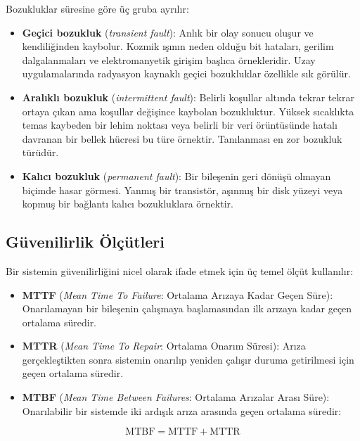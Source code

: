 Bozukluklar süresine göre üç gruba ayrılır:
\begin{itemize}
    \item \textbf{Geçici bozukluk} (\emph{transient fault}): Anlık bir olay sonucu oluşur ve kendiliğinden kaybolur. Kozmik ışının neden olduğu bit hataları, gerilim dalgalanmaları ve elektromanyetik girişim başlıca örnekleridir. Uzay uygulamalarında radyasyon kaynaklı geçici bozukluklar özellikle sık görülür.
    \item \textbf{Aralıklı bozukluk} (\emph{intermittent fault}): Belirli koşullar altında tekrar tekrar ortaya çıkan ama koşullar değişince kaybolan bozukluktur. Yüksek sıcaklıkta temas kaybeden bir lehim noktası veya belirli bir veri örüntüsünde hatalı davranan bir bellek hücresi bu türe örnektir. Tanılanması en zor bozukluk türüdür.
    \item \textbf{Kalıcı bozukluk} (\emph{permanent fault}): Bir bileşenin geri dönüşü olmayan biçimde hasar görmesi. Yanmış bir transistör, aşınmış bir disk yüzeyi veya kopmuş bir bağlantı kalıcı bozukluklara örnektir.
\end{itemize}

\subsection{Güvenilirlik Ölçütleri}
\label{subsec:guvenilirlik-olcutleri}

Bir sistemin güvenilirliğini nicel olarak ifade etmek için üç temel ölçüt kullanılır:

\begin{itemize}
    \item \textbf{MTTF} (\emph{Mean Time To Failure}: Ortalama Arızaya Kadar Geçen Süre): Onarılamayan bir bileşenin çalışmaya başlamasından ilk arızaya kadar geçen ortalama süredir.

    \item \textbf{MTTR} (\emph{Mean Time To Repair}: Ortalama Onarım Süresi): Arıza gerçekleştikten sonra sistemin onarılıp yeniden çalışır duruma getirilmesi için geçen ortalama süredir.

    \item \textbf{MTBF} (\emph{Mean Time Between Failures}: Ortalama Arızalar Arası Süre): Onarılabilir bir sistemde iki ardışık arıza arasında geçen ortalama süredir:
\end{itemize}
%
\begin{equation}
\text{MTBF} = \text{MTTF} + \text{MTTR}
\label{eq:mtbf}
\end{equation}

